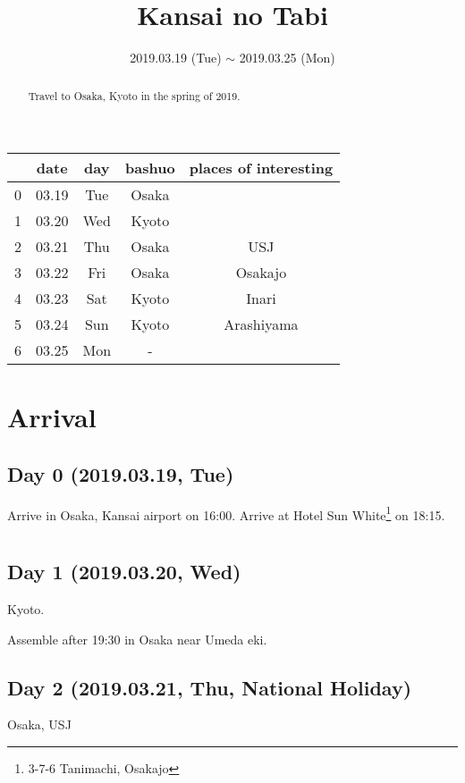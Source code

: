 \documentclass{article}
\title{Kansai no Tabi}
\date{2019.03.19 (Tue) $\sim$ 2019.03.25 (Mon)}
\begin{document}
\maketitle

\begin{abstract}
Travel to Osaka, Kyoto in the spring of 2019.
\end{abstract}

\begin{tabular}{ c | c | c | c | c }
  & date   & day  & bashuo & places of interesting \\\hline
0 & 03.19  & Tue  & Osaka & \\
1 & 03.20  & Wed  & Kyoto & \\
2 & 03.21  & Thu  & Osaka & USJ \\
3 & 03.22  & Fri  & Osaka & Osakajo \\
4 & 03.23  & Sat  & Kyoto & Inari \\
5 & 03.24  & Sun  & Kyoto & Arashiyama \\
6 & 03.25  & Mon  & - & \\
\end{tabular}


\section{Arrival}
\subsection{Day 0 (2019.03.19, Tue)}
Arrive in Osaka, Kansai airport on 16:00.
Arrive at Hotel Sun White\footnote{3-7-6 Tanimachi, Osakajo} on 18:15.

\section{}
\subsection{Day 1 (2019.03.20, Wed)}
Kyoto.

Assemble after 19:30 in Osaka near Umeda eki.

\subsection{Day 2 (2019.03.21, Thu, National Holiday)}
Osaka, USJ
\end{document}
